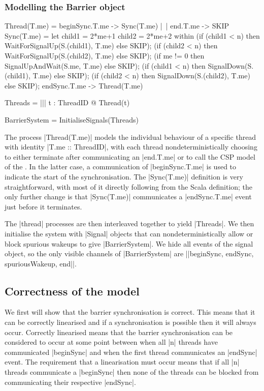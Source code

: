 \subsubsection{Modelling the Barrier object}
\inlineCSP
\begin{cspm}
  Thread(T.me) = beginSync.T.me -> Sync(T.me) |~| end.T.me -> SKIP
  Sync(T.me) = 
    let child1 = 2*me+1 
        child2 = 2*me+2
    within 
        (if (child1 < n) then WaitForSignalUp(S.(child1), T.me) else SKIP);
        (if (child2 < n) then WaitForSignalUp(S.(child2), T.me) else SKIP);
        (if me != 0 then SignalUpAndWait(S.me, T.me) else SKIP);
        (if (child1 < n) then SignalDown(S.(child1), T.me) else SKIP);
        (if (child2 < n) then SignalDown(S.(child2), T.me) else SKIP);
        endSync.T.me -> Thread(T.me)


  Threads = ||| t : ThreadID @ Thread(t)

  BarrierSystem = InitialiseSignals(Threads)
\end{cspm}

The process |Thread(T.me)| models the individual behaviour of a specific thread with identity |T.me :: ThreadID|, with each thread nondeterministically choosing to either terminate after communicating an |end.T.me| or to call the CSP model of the . In the latter case, a communication of |beginSync.T.me| is used to indicate the start of the synchronisation. The |Sync(T.me)| definition is very straightforward, with most of it directly following from the Scala definition; the only further change is that |Sync(T.me)| communicates a |endSync.T.me| event just before it terminates.

The |thread| processes are then interleaved together to yield |Threads|. We then initialise the system with |Signal| objects that can nondeterministically allow or block spurious wakeups to give |BarrierSystem|. We hide all events of the signal object, so the only visible channels of |BarrierSystem| are |{|beginSync, endSync, spuriousWakeup, end|}|.

\subsection{Correctness of the model}

We first will show that the barrier synchronisation is correct. This means that it can be correctly linearised and if a synchronisation is possible then it will always occur. Correctly linearised means that the barrier synchronisation can be considered to occur at some point between when all |n| threads have communicated |beginSync| and when the first thread communicates an |endSync| event. The requirement that a linearisation must occur means that if all |n| threads communicate a |beginSync| then none of the threads can be blocked from communicating their respective |endSync|.

